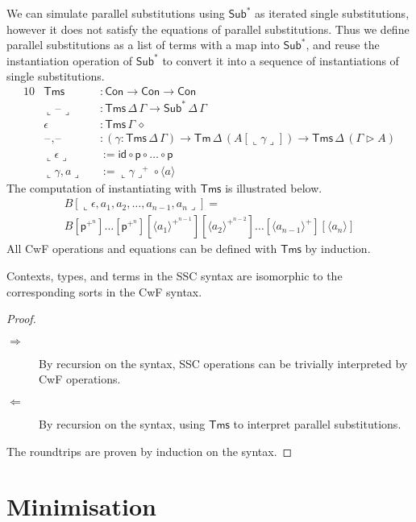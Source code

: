 \documentclass[sigplan,10pt,anonymous,review]{acmart}\settopmatter{printfolios=true,printccs=false,printacmref=false}
\newcommand{\ra}{\rightarrow}
\newcommand{\Tm}{\mathsf{Tm}}
\newcommand{\Con}{\mathsf{Con}}
\newcommand{\Sub}{\mathsf{Sub}}
\newcommand{\Tms}{\mathsf{Tms}}
\newcommand{\p}{\mathsf{p}}
\newcommand{\ext}{\mathop{\triangleright}}
\newcommand{\blank}{\mathord{\hspace{1pt}\text{--}\hspace{1pt}}} %
\newcommand{\id}{\mathsf{id}}
\begin{document}
We can simulate parallel substitutions using $\Sub^*$ as iterated single
substitutions, however it does not satisfy the equations of parallel
substitutions. Thus we define parallel substitutions as a list of terms with a
map into $\Sub^*$, and reuse the instantiation operation of $\Sub^*$ to convert it
into a sequence of instantiations of single substitutions.
\begin{alignat*}{10}
  & \Tms && : \Con\ra\Con\ra\Con \\
  & \llcorner\blank\lrcorner && : \Tms\,\Delta\,\Gamma \to \Sub^*\,\Delta\,\Gamma \\
  & \epsilon && : \Tms\,\Gamma\,\diamond \\
  & \blank,\blank && : (\gamma:\Tms\,\Delta\,\Gamma)\ra\Tm\,\Delta\,(A[\llcorner\gamma\lrcorner])\ra\Tms\,\Delta\,(\Gamma\ext A) \\
  & \llcorner\epsilon\lrcorner && := \id\circ\p\circ\dots\circ\p \\
  & \llcorner\gamma,a\lrcorner && := \llcorner\gamma\lrcorner^+\circ\langle a \rangle
\end{alignat*}
The computation of instantiating with $\Tms$ is illustrated below.
\begin{gather*}
  B[\llcorner\epsilon,a_1,a_2,\dots,a_{n-1},a_n\lrcorner] = \\
  B[\p^{+^n}]\dots[\p^{+^n}][\langle a_1 \rangle^{+^{n-1}}][\langle a_2 \rangle^{+^{n-2}}]\dots[\langle a_{n-1} \rangle^+][\langle a_n \rangle]
\end{gather*}
All CwF operations and equations can be defined with $\Tms$ by induction.

\begin{theorem}
  Contexts, types, and terms in the SSC syntax are isomorphic to the
  corresponding sorts in the CwF syntax.
\end{theorem}
\begin{proof}\leavevmode
  \begin{description}
    \item[$\Rightarrow$] By recursion on the syntax, SSC operations can be
    trivially interpreted by CwF operations.
    \item[$\Leftarrow$] By recursion on the syntax, using $\Tms$ to interpret
    parallel substitutions.
  \end{description}
  The roundtrips are proven by induction on the syntax.
\end{proof}

\section{Minimisation}
\label{sec:minimisation}
\end{document}
